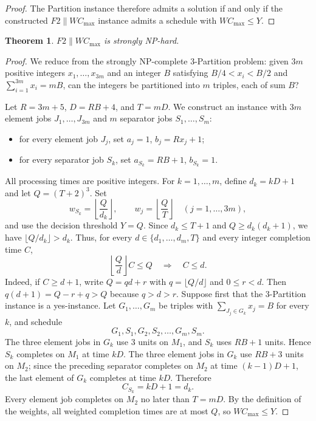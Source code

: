 \documentclass[12pt]{article}
\newtheorem{theorem}{Theorem}[section]
\begin{document}
\begin{sloppypar}
\begin{proof}
The Partition instance therefore admits a solution if and only if the constructed
$F2 \parallel W C_{\max}$ instance admits a schedule with $W C_{\max}\le Y$.
\end{proof}

\begin{theorem}\label{thm:snphard}
    $F2 \parallel W C_{\max}$ is strongly NP-hard.
\end{theorem}
\begin{proof}
We reduce from the strongly NP-complete 3-Partition problem: given $3m$ positive integers $x_1,\dots,x_{3m}$ and an integer $B$ 
satisfying $B/4 < x_i < B/2$ and $\sum_{i=1}^{3m}x_i=mB$, can the integers be partitioned into $m$ triples, each of sum $B$?

Let $R=3m+5$, $D=RB+4$, and $T=mD$. We construct an instance with $3m$ element jobs $J_1,\dots,J_{3m}$ 
and $m$ separator jobs $S_1,\dots,S_m$:
\begin{itemize}
  \item for every element job $J_j$, set $a_j=1$, $b_j=Rx_j+1$;
  \item for every separator job $S_k$, set $a_{S_k}=RB+1$, $b_{S_k}=1$.
\end{itemize}
All processing times are positive integers. For $k=1,\dots,m$, define $d_k=kD+1$ and let $Q=(T+2)^3$. Set
\[
 w_{S_k}=\left\lfloor\frac{Q}{d_k}\right\rfloor,
 \qquad
 w_j=\left\lfloor\frac{Q}{T}\right\rfloor\quad(j=1,\dots,3m),
\]
and use the decision threshold $Y=Q$. Since $d_k\le T+1$ and $Q\ge d_k(d_k+1)$, we have $\lfloor Q/d_k\rfloor>d_k$. 
Thus, for every $d\in\{d_1,\dots,d_m,T\}$ and every integer completion time $C$,
\begin{equation}\label{eq:deadline-encoding}
 \left\lfloor\frac{Q}{d}\right\rfloor C\le Q
 \quad\Longrightarrow\quad C\le d.
\end{equation}
Indeed, if $C\ge d+1$, write $Q=qd+r$ with $q=\lfloor Q/d\rfloor$ and $0\le r<d$. Then $q(d+1)=Q-r+q>Q$ because $q>d>r$.
Suppose first that the 3-Partition instance is a yes-instance. Let $G_1,\dots,G_m$ be triples with
$\sum_{J_j\in G_k}x_j=B$ for every $k$, and schedule
\[
G_1,S_1,G_2,S_2,\dots,G_m,S_m.
\]
The three element jobs in $G_k$ use $3$ units on $M_1$, and $S_k$ uses $RB+1$ units. Hence $S_k$ completes on $M_1$ 
at time $kD$. The three element jobs in $G_k$ use $RB+3$ units on $M_2$; since the preceding separator completes on $M_2$ 
at time $(k-1)D+1$, the last element of $G_k$ completes at time $kD$. Therefore
\[
 C_{S_k}=kD+1=d_k.
\]
Every element job completes on $M_2$ no later than $T=mD$. By the definition of the weights, all weighted completion times 
are at most $Q$, so $W C_{\max}\le Y$.


\end{proof}
\end{sloppypar}
\end{document}
